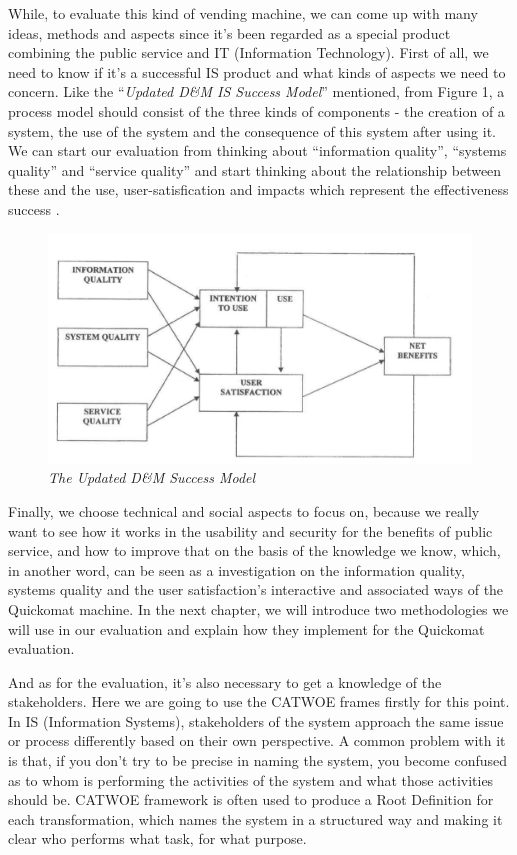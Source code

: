 \documentclass[twocolumn]{article}
\begin{document}
While, to evaluate this kind of vending machine, we can come up with many ideas, methods and aspects since it’s been regarded as a special product combining the public service and IT (Information Technology). First of all, we need to know if it's a successful IS product and what kinds of aspects we need to concern. Like the “\emph{Updated D\&M IS Success Model}” mentioned, from Figure 1, a process model should consist of the three kinds of components - the creation of a system, the use of the system and the consequence of this system after using it. We can start our evaluation from thinking about “information quality”, “systems quality” and “service quality” and start thinking about the relationship between these and the use, user-satisfication and impacts which represent the effectiveness success \citep{Delone:2003:DMM:1289765.1289767}. 
\begin{figure}
  \centering
  \includegraphics[width=\columnwidth, clip=true]{fig/DM-model.png}
  \caption{\emph{The Updated D\&M Success Model \citep[source: ][p. 23, figure 3]{Delone:2003:DMM:1289765.1289767}}}
  \label{fig:DM-model}
\end{figure}

Finally, we choose technical and social aspects to focus on, because we really want to see how it works in the usability and security for the benefits of public service, and how to improve that on the basis of the knowledge we know, which, in another word, can be seen as a investigation on the information quality, systems quality and the user satisfaction's interactive and associated ways of the Quickomat machine. In the next chapter, we will introduce two methodologies we will use in our evaluation and explain how they implement for the Quickomat evaluation. 

And as for the evaluation, it's also necessary to get a knowledge of the stakeholders. Here we are going to use the CATWOE frames firstly for this point. In IS (Information Systems), stakeholders of the system approach the same issue or process differently based on their own perspective. A common problem with it is that, if you don’t try to be precise in naming the system, you become confused as to whom is performing the activities of the system and what those activities should be. CATWOE framework is often used to produce a Root Definition for each transformation, which names the system in a structured way and making it clear who performs what task, for what purpose.
\end{document}
